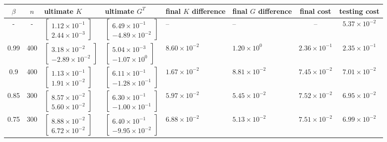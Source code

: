 \documentclass{article}
\begin{document}
\begin{table}[h!]
	\begin{center}
		\begin{tabular}{|c|c|m{3.0cm}|m{3.0cm}|m{1.7cm}|m{1.7cm}|c|c|} 
			\hline
			$\beta$ & $n$ & ultimate $K$ & ultimate $G^T$ & final $K$ difference & final $G$ difference & final cost & testing cost \\ 
			\hline
			- & - & $\begin{bmatrix}1.12\times 10^{-1} \\ 2.44\times 10^{-3}\end{bmatrix}$ & $\begin{bmatrix}6.49\times 10^{-1} \\ -4.89\times 10^{-2}\end{bmatrix}$ & -- & -- & -- & $5.37\times 10^{-2}$\\
			\hline
			\hline
			0.99 & 400 & $\begin{bmatrix}3.18\times 10^{-2} \\ -2.89\times 10^{-2}\end{bmatrix}$ & $\begin{bmatrix}5.04\times 10^{-3} \\ -1.07\times 10^{0}\end{bmatrix}$ & $8.60\times 10^{-2}$ & $1.20\times 10^{0}$ & $2.36\times 10^{-1}$ & $2.35\times 10^{-1}$\\ 
			\hline
			0.9  & 400 & $\begin{bmatrix}1.13\times 10^{-1} \\ 1.91\times 10^{-2}\end{bmatrix}$ & $\begin{bmatrix}6.11\times 10^{-1} \\ -1.28\times 10^{-1}\end{bmatrix}$ & $1.67\times 10^{-2}$ & $8.81\times 10^{-2}$ & $7.45\times 10^{-2}$ & $7.01\times 10^{-2}$\\ 
			\hline
			0.85  & 300 & $\begin{bmatrix}8.57\times 10^{-2} \\ 5.60\times 10^{-2}\end{bmatrix}$ & $\begin{bmatrix}6.30\times 10^{-1} \\ -1.00\times 10^{-1}\end{bmatrix}$ & $5.97\times 10^{-2}$ & $5.45\times 10^{-2}$ & $7.52\times 10^{-2}$ & $6.95\times 10^{-2}$\\ 
			\hline
			0.75 & 300 & $\begin{bmatrix}8.88\times 10^{-2} \\ 6.72\times 10^{-2}\end{bmatrix}$ & $\begin{bmatrix}6.40\times 10^{-1} \\ -9.95\times 10^{-2}\end{bmatrix}$ & $6.88\times 10^{-2}$ & $5.13\times 10^{-2}$ & $7.51\times 10^{-2}$ & $6.99\times 10^{-2}$\\ 

\end{tabular}
\end{center}
\end{table}
\end{document}

